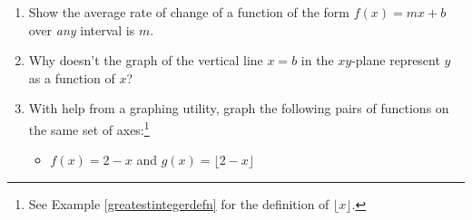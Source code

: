 \documentclass{ximera}
\begin{document}
\begin{enumerate}
\begin{enumerate}

\item  Find and interpret the average rate of change of $s$ over the following intervals:

\begin{multicols}{4}

\begin{enumerate}

\item $[14.9, 15]$

\item  $[15, 15.1]$

\item  $[14.99, 15]$

\item  $[15, 15.01]$

\end{enumerate}

\end{multicols}

\item  What value does the average rate of change appear to be approaching as the interval shrinks closer to the value $t=15$?

\item  Find the equation of the line containing $(15, 375)$ with slope $m = -50$ and graph it along with $s$ on the same set of axes using a graphing utility.  What happens as you zoom in near $(15, 375)$?

\end{enumerate}


\item  \label{lineshaveconstantratesofchange} Show the average rate of change of a function of the form $f(x) = mx+b$ over \textit{any} interval is $m$.

\item Why doesn't the graph of the vertical line $x = b$ in the $xy$-plane represent $y$ as a function of $x$?\label{whynoverticallineshere}

\item With help from a graphing utility, graph the following pairs of functions on the same set of axes:\footnote{See Example \ref{greatestintegerdefn} for the definition of $\lfloor x \rfloor$.}

\begin{multicols}{2}

\begin{itemize}


\item  $f(x) = 2-x$ and $g(x) = \lfloor 2-x \rfloor$


\end{itemize}
\end{multicols}
\end{enumerate}
\end{document}
